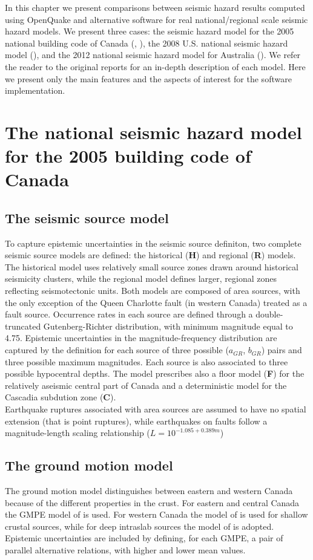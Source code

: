 In this chapter we present comparisons between seismic hazard results computed using OpenQuake and alternative software for real national/regional scale seismic hazard models. We present three cases: the seismic hazard model for the 2005 national building code of Canada (\cite{adams2003}, \cite{halchuk2008}), the 2008 U.S. national seismic hazard model (\cite{petersen2008}), and the 2012 national seismic hazard model for Australia (\cite{burbidge2012}). We refer the reader to the original reports for an in-depth description of each model. Here we present only the main features and the aspects of interest for the software implementation.


\section{The national seismic hazard model for the 2005 building code of Canada}

\subsection{The seismic source model}
To capture epistemic uncertainties in the seismic source definiton, two complete seismic source models are defined: the historical (\textbf{H}) and regional (\textbf{R}) models. The historical model uses relatively small source zones drawn around historical seismicity clusters, while the regional model defines larger, regional zones reflecting seismotectonic units. Both models are composed of area sources, with the only exception of the Queen Charlotte fault (in western Canada) treated as a fault source. Occurrence rates in each source are defined through a double-truncated Gutenberg-Richter distribution, with minimum magnitude equal to 4.75.
Epistemic uncertainties in the magnitude-frequency distribution are captured by the definition for each source of three possible ($a_{GR}$, $b_{GR}$) pairs and three possible maximum magnitudes. Each source is also associated to three possible hypocentral depths. The model prescribes also a floor model (\textbf{F}) for the relatively aseismic central part of Canada and a deterministic model for the Cascadia subdution zone (\textbf{C}).\\
Earthquake ruptures associated with area sources are assumed to have no spatial extension (that is point ruptures), while earthquakes on faults follow a magnitude-length scaling relationship ($L=10^{-1.085 + 0.389 m}$)

\subsection{The ground motion model}
The ground motion model distinguishes between eastern and western Canada because of the different properties in the crust. For eastern and central Canada the GMPE model of \cite{ab1995} is used. For western Canada the model of \cite{bjf1993} is used for shallow crustal sources, while for deep intraslab sources the model of \cite{y1997} is adopted. Epistemic uncertainties are included by defining, for each GMPE, a pair of parallel alternative relations, with higher and lower mean values.

